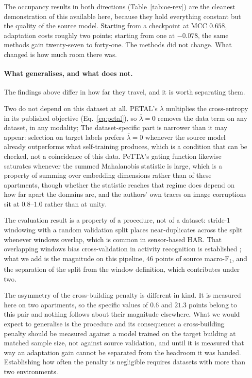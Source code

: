 \documentclass[a4paper,fleqn]{cas-dc}
\newcommand{\macf}{macro-F\textsubscript{1}}
\begin{document}
The occupancy results in both directions (Table~\ref{tab:oe-rev}) are the cleanest
demonstration of this available here, because they hold everything constant but the
quality of the source model. Starting from a checkpoint at MCC $0.658$, adaptation costs
roughly two points; starting from one at $-0.078$, the same methods gain twenty-seven to
forty-one. The methods did not change. What changed is how much room there was.

\paragraph{What generalises, and what does not.} The findings above differ in how far
they travel, and it is worth separating them.

Two do not depend on this dataset at all. PETAL's $\bar\lambda$ multiplies the
cross-entropy in its published objective (Eq.~\ref{eq:petal}), so $\bar\lambda=0$ removes
the data term on any dataset, in any modality; The dataset-specific part is
narrower than it may appear: selection on target labels prefers $\bar\lambda=0$ whenever
the source model already outperforms what self-training produces, which is a condition
that can be checked, not a coincidence of this data. PeTTA's gating function
likewise saturates whenever the summed Mahalanobis statistic is large, which is a property
of summing over embedding dimensions rather than of these apartments, though whether
the statistic reaches that regime does depend on how far apart the domains are, and the
authors' own traces on image corruptions sit at $0.8$--$1.0$ rather than at unity.

The evaluation result is a property of a procedure, not of a dataset: stride-$1$
windowing with a random validation split places near-duplicates across the split whenever
windows overlap, which is common in sensor-based HAR. That overlapping windows bias
cross-validation in activity recognition is established \cite{hammerla2015}; what we add
is the magnitude on this pipeline, $46$ points of source \macf{}, and the separation of
the split from the window definition, which contributes under two.

The asymmetry of the cross-building penalty is different in kind. It is measured here on
two apartments, so the specific values of $0.6$ and $21.3$ points belong to this pair and
nothing follows about their magnitude elsewhere. What we would expect to generalise is the
procedure and its consequence: a cross-building penalty should be measured against a model
trained on the target building at matched sample size, not against source validation, and
until it is measured that way an adaptation gain cannot be separated from the headroom it
was handed. Establishing how often the penalty is negligible requires datasets with more
than two environments.
\end{document}
